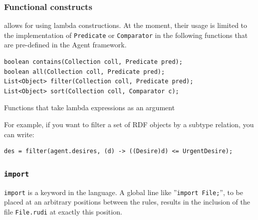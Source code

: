 \subsubsection{Functional constructs}


\vonda allows for using lambda constructions. At the moment, their usage is limited to the implementation of \texttt{Predicate} or \texttt{Comparator} in the following functions that are pre-defined in the Agent framework.

\begin{table}[htbp]
  \centering
  \begin{small}
\begin{lstlisting}
boolean contains(Collection coll, Predicate pred);
boolean all(Collection coll, Predicate pred);
List<Object> filter(Collection coll, Predicate pred);
List<Object> sort(Collection coll, Comparator c);
\end{lstlisting}
  \end{small}

  \caption{Functions that take lambda expressions as an argument}
  \label{tab:lambda-functions}
\end{table}

For example, if you want to filter a set of RDF objects by a subtype relation, you can write:

\begin{lstlisting}
des = filter(agent.desires, (d) -> ((Desire)d) <= UrgentDesire);
\end{lstlisting}

\subsubsection{\texttt{import}}

%
\texttt{import} is a keyword in the \vonda language. A global line like ''\texttt{import File;}'', to be placed at an arbitrary positions between the rules, results in the inclusion of the file \texttt{File.rudi} at exactly this position.

